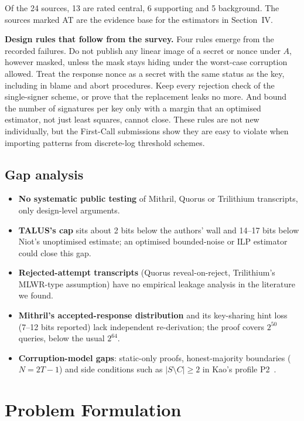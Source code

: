 \documentclass[10pt,conference,a4paper]{IEEEtran}
\begin{document}
Of the 24 sources, 13 are rated central, 6 supporting and 5 background. The sources marked AT are the evidence base for
the estimators in Section~IV.

\textbf{Design rules that follow from the survey.} Four rules emerge from the recorded failures. Do not publish any
linear image of a secret or nonce under $A$, however masked, unless the mask stays hiding under the worst-case corruption
allowed. Treat the response nonce as a secret with the same status as the key, including in blame and abort procedures.
Keep every rejection check of the single-signer scheme, or prove that the replacement leaks no more. And bound the
number of signatures per key only with a margin that an optimised estimator, not just least squares, cannot close. These
rules are not new individually, but the First-Call submissions show they are easy to violate when importing patterns
from discrete-log threshold schemes.

\subsection{Gap analysis}
\begin{itemize}
\item \textbf{No systematic public testing} of Mithril, Quorus or Trilithium transcripts, only design-level arguments.
\item \textbf{TALUS's cap} sits about 2 bits below the authors' wall and 14--17 bits below Niot's unoptimised estimate; an
optimised bounded-noise or ILP estimator could close this gap.
\item \textbf{Rejected-attempt transcripts} (Quorus reveal-on-reject, Trilithium's MLWR-type assumption) have no
empirical leakage analysis in the literature we found.
\item \textbf{Mithril's accepted-response distribution} and its key-sharing hint loss (7--12 bits reported) lack
independent re-derivation; the proof covers $2^{50}$ queries, below the usual $2^{64}$.
\item \textbf{Corruption-model gaps}: static-only proofs, honest-majority boundaries ($N=2T-1$) and side conditions such
as $|S\setminus C|\ge2$ in Kao's profile P2~\cite{kao}.
\end{itemize}

\section{Problem Formulation}
\end{document}
